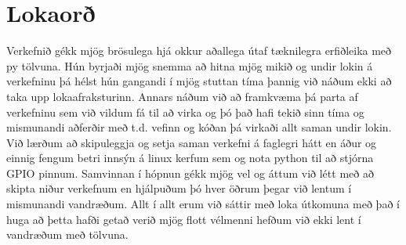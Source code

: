 \section{Lokaorð}
Verkefnið gékk mjög brösulega hjá okkur aðallega útaf tæknilegra erfiðleika með py tölvuna. Hún byrjaði mjög snemma að hitna mjög mikið og undir lokin á verkefninu þá hélst hún gangandi í mjög stuttan tíma þannig við náðum ekki að taka upp lokaafraksturinn.
Annars náðum við að framkvæma þá parta af verkefninu sem við vildum fá til að virka og þó það hafi tekið sinn tíma og mismunandi aðferðir með t.d. vefinn og kóðan þá virkaði allt saman undir lokin. Við lærðum að skipuleggja og setja saman verkefni á faglegri hátt en áður og einnig fengum betri innsýn á linux kerfum sem og nota python til að stjórna GPIO pinnum.
Samvinnan í hópnun gékk mjög vel og áttum við létt með að skipta niður verkefnum en hjálpuðum þó hver öðrum þegar við lentum í mismunandi vandræðum.
Allt í allt erum við sáttir með loka útkomuna með það í huga að þetta hafði getað verið mjög flott vélmenni hefðum við ekki lent í vandræðum með tölvuna.